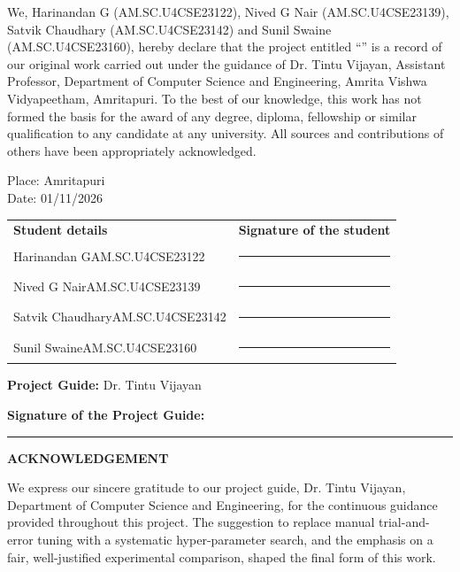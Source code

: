 \noindent
We, Harinandan G (AM.SC.U4CSE23122), Nived G Nair (AM.SC.U4CSE23139), Satvik Chaudhary (AM.SC.U4CSE23142) and Sunil Swaine (AM.SC.U4CSE23160), hereby declare that the project entitled ``\ProjectTitle{}'' is a record of our original work carried out under the guidance of Dr. Tintu Vijayan, Assistant Professor, Department of Computer Science and Engineering, Amrita Vishwa Vidyapeetham, Amritapuri. To the best of our knowledge, this work has not formed the basis for the award of any degree, diploma, fellowship or similar qualification to any candidate at any university. All sources and contributions of others have been appropriately acknowledged.

\vspace{0.5cm}

\noindent
Place: Amritapuri\\
Date: 01/11/2026

\vspace{0.7cm}

\noindent
\begin{tabular}{@{}p{}p{}@{}}
\textbf{Student details} & \textbf{Signature of the student} \\[14pt]
Harinandan G\newline AM.SC.U4CSE23122 & \rule{0.30\textwidth}{0.4pt} \\[18pt]
Nived G Nair\newline AM.SC.U4CSE23139 & \rule{0.30\textwidth}{0.4pt} \\[18pt]
Satvik Chaudhary\newline AM.SC.U4CSE23142 & \rule{0.30\textwidth}{0.4pt} \\[18pt]
Sunil Swaine\newline AM.SC.U4CSE23160 & \rule{0.30\textwidth}{0.4pt}
\end{tabular}

\vspace{0.8cm}

\noindent
\textbf{Project Guide:} Dr. Tintu Vijayan

\vspace{0.5cm}

\noindent
\textbf{Signature of the Project Guide:}
\rule{4cm}{0.4pt}

\clearpage
{}
\pagestyle{plain}

{}
{\centering \Large\bfseries ACKNOWLEDGEMENT\par}
\vspace{0.4cm}
We express our sincere gratitude to our project guide, Dr. Tintu Vijayan, Department of Computer Science and Engineering, for the continuous guidance provided throughout this project. The suggestion to replace manual trial-and-error tuning with a systematic hyper-parameter search, and the emphasis on a fair, well-justified experimental comparison, shaped the final form of this work.

